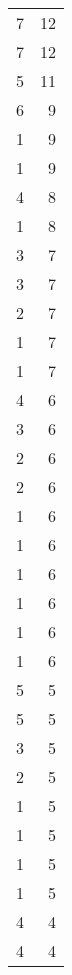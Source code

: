 \begin{tabular}{rr}
                  7 &            12 \\
                  7 &            12 \\
                  5 &            11 \\
                  6 &             9 \\
                  1 &             9 \\
                  1 &             9 \\
                  4 &             8 \\
                  1 &             8 \\
                  3 &             7 \\
                  3 &             7 \\
                  2 &             7 \\
                  1 &             7 \\
                  1 &             7 \\
                  4 &             6 \\
                  3 &             6 \\
                  2 &             6 \\
                  2 &             6 \\
                  1 &             6 \\
                  1 &             6 \\
                  1 &             6 \\
                  1 &             6 \\
                  1 &             6 \\
                  1 &             6 \\
                  5 &             5 \\
                  5 &             5 \\
                  3 &             5 \\
                  2 &             5 \\
                  1 &             5 \\
                  1 &             5 \\
                  1 &             5 \\
                  1 &             5 \\
                  4 &             4 \\
                  4 &             4 \\

\end{tabular}
